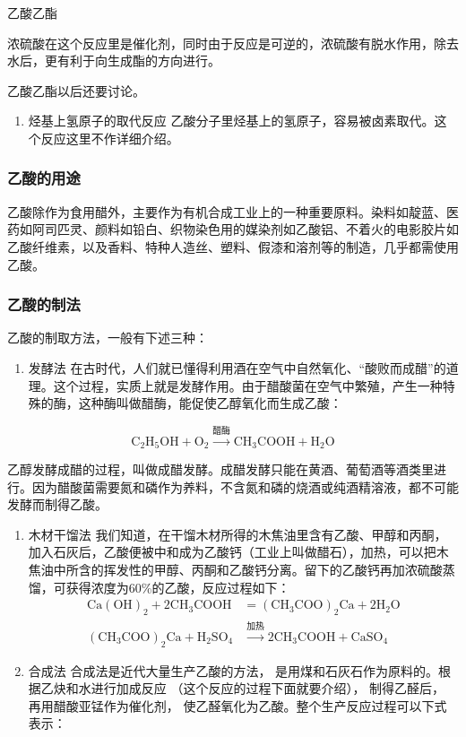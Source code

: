 乙酸乙酯

浓硫酸在这个反应里是催化剂，同时由于反应是可逆的，浓硫酸有脱水作用，除去水后，更有利于向生成酯的方向进行。

乙酸乙酯以后还要讨论。

\begin{enumerate}[start=3]
\item
  烃基上氢原子的取代反应
  乙酸分子里烃基上的氢原子，容易被卤素取代。这个反应这里不作详细介绍。
\end{enumerate}

\subsubsection{乙酸的用途}

乙酸除作为食用醋外，主要作为有机合成工业上的一种重要原料。染料如靛蓝、医药如阿司匹灵、颜料如铅白、织物染色用的媒染剂如乙酸铝、不着火的电影胶片如乙酸纤维素，以及香料、特种人造丝、塑料、假漆和溶剂等的制造，几乎都需使用乙酸。

\subsubsection{乙酸的制法}

乙酸的制取方法，一般有下述三种：

\begin{enumerate}
\item
  发酵法
  在古时代，人们就已懂得利用酒在空气中自然氧化、``酸败而成醋''的道理。这个过程，实质上就是发酵作用。由于醋酸菌在空气中繁殖，产生一种特殊的酶，这种酶叫做醋酶，能促使乙醇氧化而生成乙酸：
\end{enumerate}

\[
\mathrm{C}_{2}\mathrm{H}_{5}\mathrm{OH}+\mathrm{O}_{2}\xrightarrow{\text{醋酶}}\mathrm{CH}_{3}\mathrm{COOH}+\mathrm{H}_{2}\mathrm{O}
\]

乙醇发酵成醋的过程，叫做成醋发酵。成醋发酵只能在黄酒、葡萄酒等酒类里进行。因为醋酸菌需要氮和磷作为养料，不含氮和磷的烧酒或纯酒精溶液，都不可能发酵而制得乙酸。

\begin{enumerate}[start=2]
\item
  木材干馏法
  我们知道，在干馏木材所得的木焦油里含有乙酸、甲醇和丙酮，加入石灰后，乙酸便被中和成为乙酸钙（工业上叫做醋石），加热，可以把木焦油中所含的挥发性的甲醇、丙酮和乙酸钙分离。留下的乙酸钙再加浓硫酸蒸馏，可获得浓度为60\%的乙酸，反应过程如下：
\[
\begin{aligned}\mathrm{Ca(OH)}_{2}+2\mathrm{CH}_{3}\mathrm{COOH}&=(\mathrm{CH}_{3}\mathrm{COO})_{2}\mathrm{Ca}+2\mathrm{H}_{2}\mathrm{O}\\(\mathrm{CH}_{3}\mathrm{COO})_{2}\mathrm{Ca}+\mathrm{H}_{2}\mathrm{SO}_{4}&\xrightarrow{\text{加热}}2\mathrm{CH}_{3}\mathrm{COOH}+\mathrm{CaSO}_{4}\end{aligned}
\]
\item
  合成法 合成法是近代大量生产乙酸的方法，
  是用煤和石灰石作为原料的。根据乙炔和水进行加成反应
  （这个反应的过程下面就要介绍）， 制得乙醛后， 再用醋酸亚锰作为催化剂，
  使乙醛氧化为乙酸。整个生产反应过程可以下式表示：
\end{enumerate}

